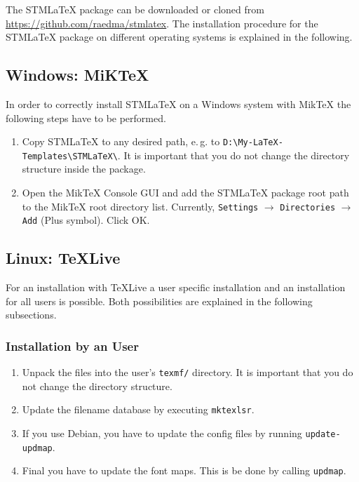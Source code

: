 \documentclass{scrartcl}
\newcommand{\stmlatex}{STM\LaTeX\xspace}
\begin{document}
The \stmlatex package can be downloaded or cloned from \url{https://github.com/raedma/stmlatex}. The installation procedure for the \stmlatex package on different operating systems is explained in the following.

\subsection{Windows: MiKTeX}

In order to correctly install \stmlatex on a Windows system with MikTeX the following steps have to be performed. 

\begin{enumerate}
  \item Copy \stmlatex to any desired path, e.\,g. to \texttt{D:\textbackslash My-LaTeX-Templates\textbackslash STMLaTeX\textbackslash}. It is important that you do not change the directory structure inside the package.
  \item Open the MikTeX Console GUI and add the \stmlatex package root path to the MikTeX root directory list. Currently, \texttt{Settings} $\rightarrow$ \texttt{Directories} $\rightarrow$ \texttt{Add} (Plus symbol). Click OK.
\end{enumerate}

\subsection{Linux: TeXLive}

For an installation with TeXLive a user specific installation and an installation for all users is possible. Both possibilities are explained in the following subsections.

\subsubsection{Installation by an User}
\begin{enumerate}		
  \item Unpack the files into the user's \texttt{texmf/} directory. It is important that you do not change the directory structure.
  \item Update the filename database by executing \texttt{mktexlsr}.
  \item If you use Debian, you have to update the config files by running \texttt{update-updmap}.
  \item Final you have to update the font maps. This is be done by calling \texttt{updmap}.
\end{enumerate}
\end{document}
